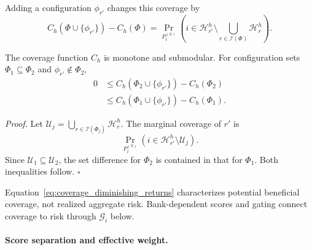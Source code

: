 Adding a configuration $\phi_{r'}$ changes this coverage by
\begin{equation}
  C_h(\Phi\cup\{\phi_{r'}\})-C_h(\Phi)
  =\Pr_{P_t^{(h)}}\!\left(
    i\in\mathcal H_{r'}^h\setminus
    \bigcup_{r\in\mathcal I(\Phi)}\mathcal H_r^h
  \right).
  \label{eq:coverage_gain}
\end{equation}

\begin{lemma}
\label{prop:coverage_submodular}
The coverage function $C_h$ is monotone and submodular. For configuration
sets $\Phi_1\subseteq\Phi_2$ and $\phi_{r'}\notin\Phi_2$,
\begin{equation}
\begin{aligned}
0
&\leq C_h(\Phi_2\cup\{\phi_{r'}\})-C_h(\Phi_2)\\
&\leq C_h(\Phi_1\cup\{\phi_{r'}\})-C_h(\Phi_1).
\end{aligned}
\label{eq:coverage_diminishing_returns}
\end{equation}
\end{lemma}

\noindent\emph{Proof.}
Let
$\mathcal U_j=\bigcup_{r\in\mathcal I(\Phi_j)}\mathcal H_r^h$.
The marginal
coverage of $r'$ is
\[
\Pr_{P_t^{(h)}}(i\in\mathcal H_{r'}^h\setminus\mathcal U_j).
\]
Since $\mathcal U_1\subseteq\mathcal U_2$, the set difference for
$\Phi_2$ is contained in that for $\Phi_1$.  Both inequalities follow.
\hfill$\square$

Equation~\eqref{eq:coverage_diminishing_returns} characterizes potential
beneficial coverage, not realized aggregate risk. Bank-dependent scores and
gating connect coverage to risk through $\mathcal G_i$ below.

\paragraph{Score separation and effective weight.}
\label{app:evidence-separation}

